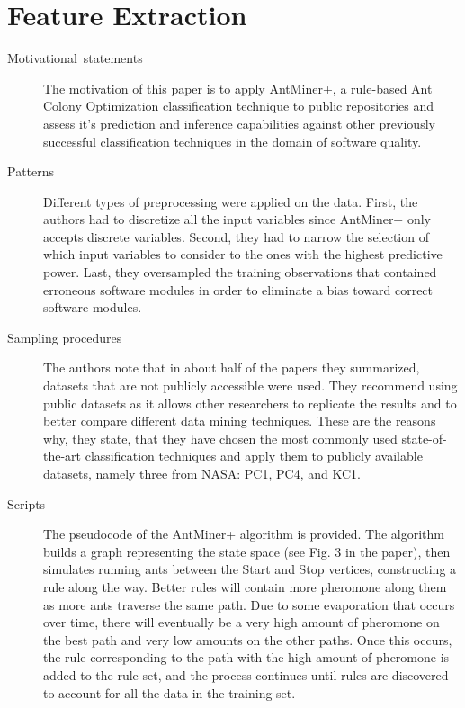 \documentclass[english]{article}
\begin{document}
\section*{Feature Extraction}
\begin{description}
\item [{Motivational~statements}] The motivation of this paper is to apply AntMiner+, a rule-based Ant Colony Optimization classification technique to public repositories and assess it's prediction and inference capabilities against other previously successful classification techniques in the domain of software quality.
\item[{Patterns}] Different types of preprocessing were applied on the data. First, the authors had to discretize all the input variables since AntMiner+ only accepts discrete variables. Second, they had to narrow the selection of which input variables to consider to the ones with the highest predictive power. Last, they oversampled the training observations that contained erroneous software modules in order to eliminate a bias toward correct software modules.
\item[{Sampling procedures}] The authors note that in about half of the papers they summarized, datasets that are not publicly accessible were used. They recommend using public datasets as it allows other researchers to replicate the results and to better compare different data mining techniques. These are the reasons why, they state, that they have chosen the most commonly used state-of-the-art classification techniques and apply them to publicly available datasets, namely three from NASA: PC1, PC4, and KC1.
\item[{Scripts}] The pseudocode of the AntMiner+ algorithm is provided. The algorithm builds a graph representing the state space (see Fig. 3 in the paper), then simulates running ants between the Start and Stop vertices, constructing a rule along the way. Better rules will contain more pheromone along them as more ants traverse the same path. Due to some evaporation that occurs over time, there will eventually be a very high amount of pheromone on the best path and very low amounts on the other paths. Once this occurs, the rule corresponding to the path with the high amount of pheromone is added to the rule set, and the process continues until rules are discovered to account for all the data in the training set. 
\end{description}
\end{document}
